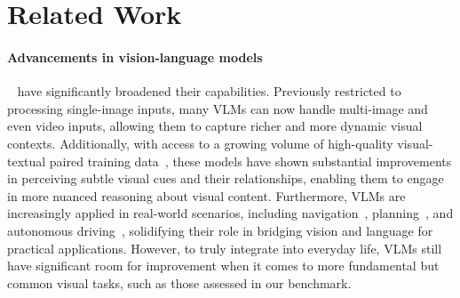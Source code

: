 \section{Related Work}

\paragraph{Advancements in vision-language models}~\citep{gpt4o,Qwen2.5-VL,longva,llava-onevision,mplug-owl3,internvl,liang2024foundations} have significantly broadened their capabilities. Previously restricted to processing single-image inputs, many VLMs can now handle multi-image and even video inputs, allowing them to capture richer and more dynamic visual contexts. Additionally, with access to a growing volume of high-quality visual-textual paired training data~\citep{image-hq-1,image-hq2,image-hq-3,video-hq1,video-hq2}, these models have shown substantial improvements in perceiving subtle visual cues and their relationships, enabling them to engage in more nuanced reasoning about visual content. Furthermore, VLMs are increasingly applied in real-world scenarios, including navigation~\citep{navigation}, planning~\citep{motion}, and autonomous driving~\citep{driving}, solidifying their role in bridging vision and language for practical applications. However, to truly integrate into everyday life, VLMs still have significant room for improvement when it comes to more fundamental but common visual tasks, such as those assessed in our benchmark.


